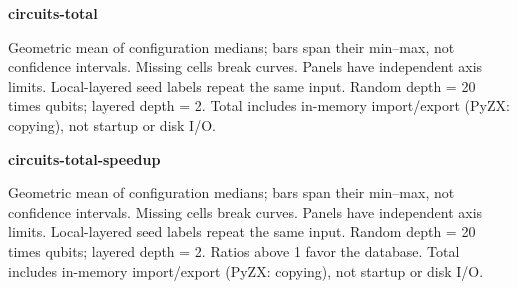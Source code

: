 \documentclass{article}
\begin{document}
\clearpage
\begin{center}
\textbf{circuits-total}\par\medskip

\end{center}
Geometric mean of configuration medians; bars span their min--max, not confidence intervals. Missing cells break curves. Panels have independent axis limits. Local-layered seed labels repeat the same input. Random depth = 20 times qubits; layered depth = 2. Total includes in-memory import/export (PyZX: copying), not startup or disk I/O.
\clearpage
\begin{center}
\textbf{circuits-total-speedup}\par\medskip

\end{center}
Geometric mean of configuration medians; bars span their min--max, not confidence intervals. Missing cells break curves. Panels have independent axis limits. Local-layered seed labels repeat the same input. Random depth = 20 times qubits; layered depth = 2. Ratios above 1 favor the database. Total includes in-memory import/export (PyZX: copying), not startup or disk I/O.
\clearpage
\end{document}
